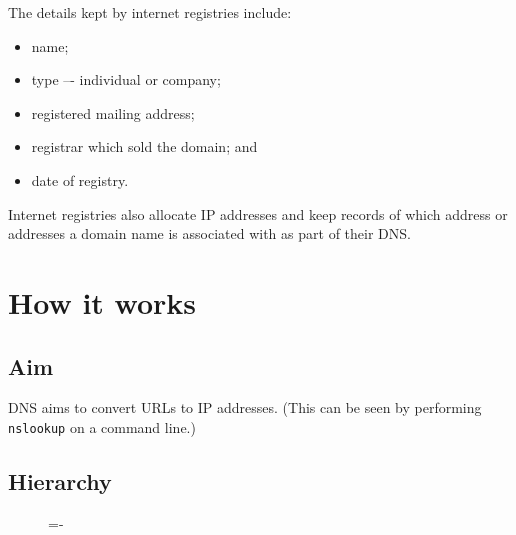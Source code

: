 \documentclass[a4paper]{systems-software}
\begin{document}
The details kept by internet registries include:
\begin{itemize}
	\item name;
	\item type –- individual or company;
	\item registered mailing address;
	\item registrar which sold the domain; and
	\item date of registry.
\end{itemize}

Internet registries also allocate IP addresses and keep records of which address or addresses a domain name is associated with as part of their DNS.


\section*{How it works}

\subsection*{Aim}

DNS aims to convert URLs to IP addresses. (This can be seen by performing \texttt{nslookup} on a command line.)


\subsection*{Hierarchy}

\begin{figure}[H]
	\lineskip=-\fboxrule
\end{figure}
\end{document}
